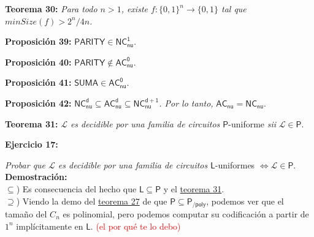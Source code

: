 \documentclass{article}
\begin{document}
\begin{flushleft}
  \textbf{Teorema 30:}
  \textit{Para todo $n > 1$, existe $f : \{0,1\}^n \rightarrow \{0,1\}$ tal que $minSize(f) > 2^n / 4n$.}
\end{flushleft}

\begin{flushleft}
  \textbf{Proposición 39:}
  $\mathsf{PARITY \in NC^1_{nu}}$.
\end{flushleft}

\begin{flushleft}
  \textbf{Proposición 40:}
  $\mathsf{PARITY \not\in AC^0_{nu}}$.
\end{flushleft}

\begin{flushleft}
  \textbf{Proposición 41:}
  $\mathsf{SUMA \in AC^0_{nu}}$.
\end{flushleft}

\begin{flushleft}
  \textbf{Proposición 42:}
  $\mathsf{NC^d_{nu} \subseteq AC^d_{nu} \subseteq NC^{d+1}_{nu}}$\textit{. Por lo tanto,} $\mathsf{AC_{nu} = 
  NC_{nu}}$.
\end{flushleft}

\begin{flushleft}
  \textbf{\hypertarget{teo31}{Teorema 31:}}
  \textit{$\mathcal{L}$ es decidible por una familia de circuitos $\mathsf{P}$}-uniforme \textit{sii} $
  \mathcal{L} \in \mathsf{P}$.
\end{flushleft}

\begin{flushleft}
  \hypertarget{ej17}{\textbf{Ejercicio 17:}}
  \textit{Probar que $\mathcal{L}$ es decidible por una familia de circuitos $\mathsf{L}$}-uniformes $\iff 
  \mathcal{L} \in \mathsf{P}$. \\[0.5em]

  \textbf{\textcolor{Mulberry}{Demostración:}} \\[0.5em]

  \textcolor{Mulberry}{$\subseteq$)}
  Es consecuencia del hecho que $\mathsf{L \subseteq P}$ y el \textcolor{Rhodamine}{\hyperlink{teo31}{teorema 31}}.
  \\[0.5em]

  \textcolor{Mulberry}{$\supseteq$)}
  Viendo la demo del \textcolor{Rhodamine}{\hyperlink{teo27}{teorema 27}} de que $\mathsf{P \subseteq P_{/poly}}$,
  podemos ver que el tamaño del $C_n$ es polinomial, pero podemos computar su codificación a partir de $1^n$ 
  implícitamente en $\mathsf{L}$. \textcolor{Red}{(el por qué te lo debo)}
\end{flushleft}
\end{document}

